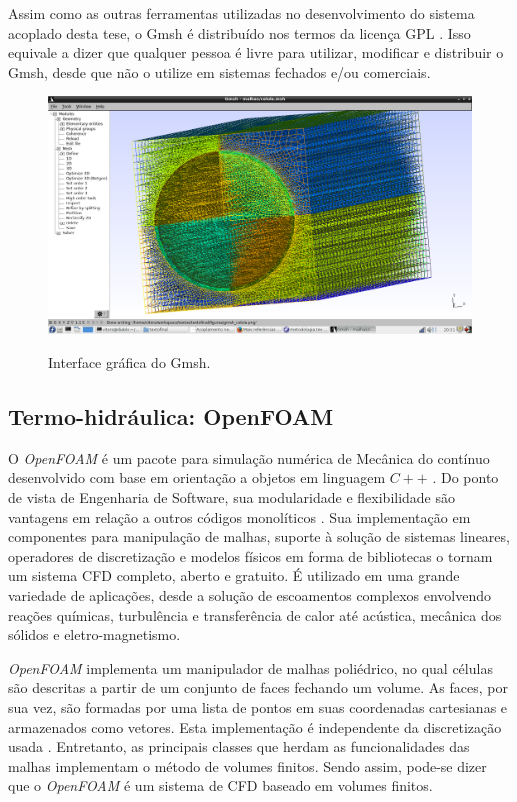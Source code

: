 Assim como as outras ferramentas utilizadas no desenvolvimento do sistema acoplado desta tese,
o Gmsh é distribuído nos termos da licença GPL \cite{gplv3}. Isso equivale a dizer que
qualquer pessoa é livre para utilizar, modificar e distribuir o Gmsh, desde que não o utilize
em sistemas fechados e/ou comerciais.

\begin{figure}[htb]
  \caption{Interface gráfica do Gmsh. }
  \centering\includegraphics[scale=0.45]{figuras/gmsh_celula.png}
  \label{fig:gui-gmsh}
\end{figure}


\subsection{Termo-hidráulica: \textbf{OpenFOAM}}
\label{subsection:openfoam}

O \textit{OpenFOAM} é um pacote para simulação numérica de Mecânica
do contínuo desenvolvido com base em orientação a objetos em linguagem $C++$ .
Do ponto de vista de Engenharia de Software, sua modularidade e flexibilidade são vantagens
em relação a outros códigos monolíticos  \cite{Jasak2007}. Sua implementação em componentes para manipulação de malhas, suporte
à solução de sistemas lineares, operadores de discretização e modelos físicos em forma de bibliotecas o tornam
um sistema CFD completo, aberto e gratuito. É utilizado em uma grande variedade
de aplicações, desde a solução de escoamentos complexos envolvendo reações químicas, turbulência e
transferência de calor até acústica, mecânica dos sólidos e eletro-magnetismo. 

\textit{OpenFOAM} implementa um manipulador de malhas poliédrico, no qual células são descritas a partir
de um conjunto de faces fechando um volume. As faces, por sua vez, são formadas por uma lista de pontos
em suas coordenadas cartesianas e armazenados como vetores. Esta implementação é independente da discretização
usada \cite{Jasak2009}. Entretanto, as principais classes que herdam as funcionalidades das malhas implementam o método de
volumes finitos. Sendo assim, pode-se dizer que o \textit{OpenFOAM} é um sistema de CFD baseado em volumes
finitos.

